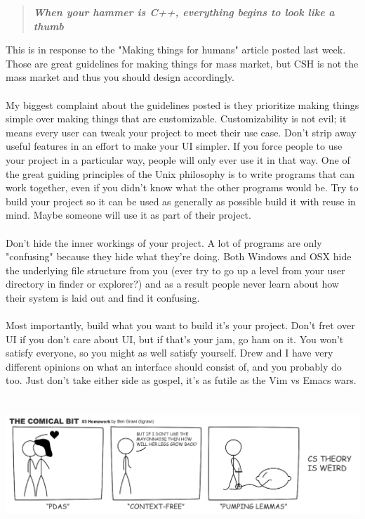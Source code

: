 \documentclass[9pt]{extarticle} %
\begin{document}

\vspace{-15px}
\begin{quote}
\centering
\textbf{\textit{When your hammer is C++, everything begins to look like a thumb}}
\end{quote}
\vspace{5px}
\hypertarget{secondnews}{}


This is in response to the "Making things for humans" article posted last week. Those are great guidelines for making things for mass market, but CSH is not the mass market and thus you should design accordingly. 
\\
\\
My biggest complaint about the guidelines posted is they prioritize making things simple over making things that are customizable. Customizability is not evil; it means every user can tweak your project to meet their use case. Don't strip away useful features in an effort to make your UI simpler. If you force people to use your project in a particular way, people will only ever use it in that way. One of the great guiding principles of the Unix philosophy is to write programs that can work together, even if you didn't know what the other programs would be. Try to build your project so it can be used as generally as possible build it with reuse in mind. Maybe someone will use it as part of their project.
\\
\\
Don't hide the inner workings of your project. A lot of programs are only "confusing"
because they hide what they're doing. Both Windows and OSX hide the underlying file structure from you (ever try to go up a level from your user directory in finder or explorer?) and as a result people never learn about how their system is laid out and find it confusing.
\\
\\
Most importantly, build what you want to build it's your project. Don't fret over UI if you don't care about UI, but if that's your jam, go ham on it. You won't satisfy everyone, so you might as well satisfy yourself. Drew and I have very different opinions on what an interface should consist of, and you probably do too. Just don't take either side as gospel, it's as futile as the Vim vs Emacs wars.
\\
\\
\\
\includegraphics[width=\linewidth]{imgs/cstheory.png} 
\end{document}
